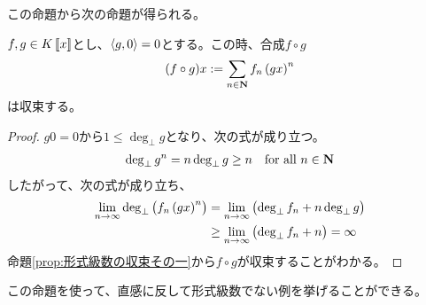 {	この命題から次の命題が得られる。

	\begin{proposition}[形式級数の収束その三]\label{prop:形式級数の収束その三} %
		$f,g\in K\mathinner{[\![{x}]\!]}$とし、$\mathinner{\langle{g,0}\rangle}=0$とする。この時、合成$f\circ g$
		\begin{equation*}\begin{split}
			(f\circ g)x := \sum_{n\in\mathbf{N}} f_n\mathinner{({gx})}^n
		\end{split}\end{equation*}
		は収束する。\EOP
	\end{proposition} %
	\begin{proof} %
		$g0=0$から$1\le\deg_\bot g$となり、次の式が成り立つ。
		\begin{equation*}\begin{split}
			\deg_\bot g^n = n\deg_\bot g \ge n \quad\text{for all } n\in\mathbf{N}
		\end{split}\end{equation*}
		したがって、次の式が成り立ち、
		\begin{equation*}\begin{split}
			\lim_{n\to\infty} \deg_\bot\mathinner{\bigl({f_n\mathinner{({gx})}^n}\bigr)}
			&= \lim_{n\to\infty}\mathinner{\bigl({\deg_\bot f_n + n \deg_\bot g}\bigr)} \\
			&\ge \lim_{n\to\infty}\mathinner{\bigl({\deg_\bot f_n + n}\bigr)} = \infty
		\end{split}\end{equation*}
		命題\ref{prop:形式級数の収束その一}から$f\circ g$が収束することがわかる。
	\end{proof} %

	この命題を使って、直感に反して形式級数でない例を挙げることができる。
	
}

